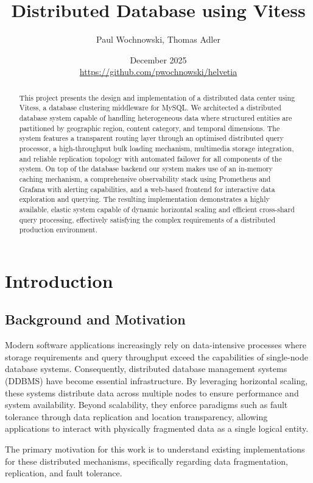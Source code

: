 \documentclass{article}
\title{Distributed Database using Vitess}
\author{Paul Wochnowski, Thomas Adler}
\date{December 2025\\
\href{https://github.com/pwochnowski/helvetia}{https://github.com/pwochnowski/helvetia}}
\begin{document}
\maketitle

\begin{abstract}
This project presents the design and implementation of a distributed data center using Vitess, a database clustering middleware for MySQL. We architected a distributed database system capable of handling heterogeneous data where structured entities are partitioned by geographic region, content category, and temporal dimensions. The system features a transparent routing layer through an optimised distributed query processor, a high-throughput bulk loading mechanism, multimedia storage integration, and reliable replication topology with automated failover for all components of the system. On top of the database backend our system makes use of an in-memory caching mechanism, a comprehensive observability stack using Prometheus and Grafana with alerting capabilities, and a web-based frontend for interactive data exploration and querying. The resulting implementation demonstrates a highly available, elastic system capable of dynamic horizontal scaling and efficient cross-shard query processing, effectively satisfying the complex requirements of a distributed production environment.
\end{abstract}

\section{Introduction}

\subsection{Background and Motivation}
Modern software applications increasingly rely on data-intensive processes where storage requirements and query throughput exceed the capabilities of single-node database systems. Consequently, distributed database management systems (DDBMS) have become essential infrastructure. By leveraging horizontal scaling, these systems distribute data across multiple nodes to ensure performance and system availability. Beyond scalability, they enforce paradigms such as fault tolerance through data replication and location transparency, allowing applications to interact with physically fragmented data as a single logical entity.

The primary motivation for this work is to understand existing implementations for these distributed mechanisms, specifically regarding data fragmentation, replication, and fault tolerance. 
\end{document}
